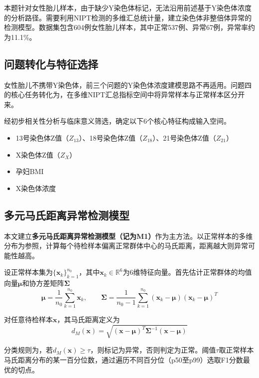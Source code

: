 \documentclass[withoutpreface]{cumcmthesis}
\begin{document}
本题针对女性胎儿样本，由于缺少Y染色体标记，无法沿用前述基于Y染色体浓度的分析路径。需要利用NIPT检测的多维汇总统计量，建立染色体非整倍体异常的检测模型。数据集包含604例女性胎儿样本，其中正常537例、异常67例，异常率约为11.1\%。

\subsection{问题转化与特征选择}

女性胎儿不携带Y染色体，前三个问题的Y染色体浓度建模思路不再适用。问题四的核心任务转化为，在多维NIPT汇总指标空间中将异常样本与正常样本区分开来。

经初步相关性分析与临床意义筛选，确定以下6个核心特征构成输入空间。

\begin{itemize}
  \item 13号染色体Z值（$Z_{13}$）、18号染色体Z值（$Z_{18}$）、21号染色体Z值（$Z_{21}$）
  \item X染色体Z值（$Z_X$）
  \item 孕妇BMI
  \item X染色体浓度
\end{itemize}

\subsection{多元马氏距离异常检测模型}

本文建立\textbf{多元马氏距离异常检测模型（记为M1）}作为主方法。以正常样本的多维分布为参照，计算每个待检样本偏离正常群体中心的马氏距离，距离越大则异常可能性越高。

设正常样本集为$\{\mathbf{x}_k\}_{k=1}^{n_0}$，其中$\mathbf{x}_k \in \mathbb{R}^6$为6维特征向量。首先估计正常群体的均值向量$\boldsymbol{\mu}$和协方差矩阵$\boldsymbol{\Sigma}$
\begin{equation}
  \boldsymbol{\mu} = \frac{1}{n_0}\sum_{k=1}^{n_0}\mathbf{x}_k, \qquad
  \boldsymbol{\Sigma} = \frac{1}{n_0-1}\sum_{k=1}^{n_0}(\mathbf{x}_k - \boldsymbol{\mu})(\mathbf{x}_k - \boldsymbol{\mu})^T
\end{equation}

对任意待检样本$\mathbf{x}$，其马氏距离定义为
\begin{equation}\label{eq:mahal}
  d_M(\mathbf{x}) = \sqrt{(\mathbf{x} - \boldsymbol{\mu})^T \boldsymbol{\Sigma}^{-1} (\mathbf{x} - \boldsymbol{\mu})}
\end{equation}

分类规则为，若$d_M(\mathbf{x}) \geq \tau$，则标记为异常，否则判定为正常。阈值$\tau$取正常样本马氏距离分布的某一百分位数，通过遍历不同百分位（p50至p99）选取F1分数最优的切点。
\end{document}
